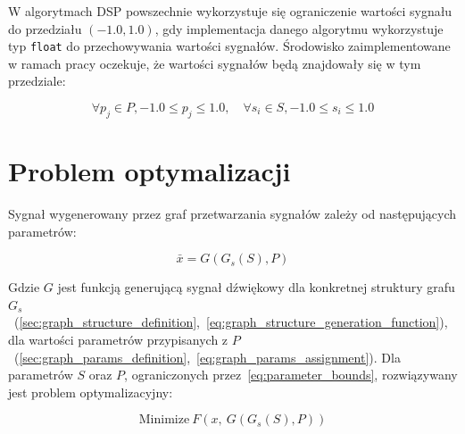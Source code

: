 W algorytmach DSP powszechnie wykorzystuje się ograniczenie wartości
sygnału do przedziału $(-1.0, 1.0)$, gdy implementacja danego algorytmu wykorzystuje 
typ \texttt{float} do przechowywania wartości sygnałów. Środowisko zaimplementowane
w ramach pracy oczekuje, że wartości sygnałów będą znajdowały się w tym przedziale:

\begin{equation}
  \forall p_j \in P,  -1.0 \leq p_j \leq 1.0, \quad \forall s_i \in S, -1.0 \leq s_i \leq 1.0
  \label{eq:parameter_bounds}
\end{equation}

\section{Problem optymalizacji}

Sygnał wygenerowany przez graf przetwarzania sygnałów zależy od następujących parametrów:

\begin{equation}
  \bar{x} = G(G_s(S), P)
  \label{eq:graph_generated_signal}
\end{equation}

\noindent
Gdzie $G$ jest funkcją generującą sygnał dźwiękowy dla konkretnej struktury grafu
$G_s$~(\ref{sec:graph_structure_definition},~\ref{eq:graph_structure_generation_function}),
dla wartości parametrów przypisanych z
$P$~(\ref{sec:graph_params_definition},~\ref{eq:graph_params_assignment}).
Dla parametrów $S$ oraz $P$, ograniczonych przez~\ref{eq:parameter_bounds},
rozwiązywany jest problem optymalizacyjny:

\begin{equation}
  \text{Minimize}~F(x,~G(G_s(S), P))
  \label{eq:target_function}
\end{equation}

